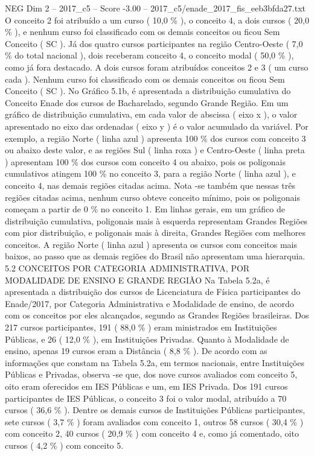 \begin{textsample}{NEG Dim 2 – 2017\_c5 – Score -3.00 – 2017\_c5/enade\_2017\_fis\_eeb3bfda27.txt}
O conceito 2 foi atribuído a um curso ( 10,0 \% ), o conceito 4, a dois cursos ( 20,0 \% ), e nenhum curso foi classificado com os demais conceitos ou ficou Sem Conceito ( SC ).
Já dos quatro cursos participantes na região Centro-Oeste ( 7,0 \% do total nacional ), dois receberam conceito 4, o conceito modal ( 50,0 \% ), como já fora destacado.
A dois cursos foram atribuídos conceitos 2 e 3 ( um curso cada ).
Nenhum curso foi classificado com os demais conceitos ou ficou Sem Conceito ( SC ).
No Gráfico 5.1b, é apresentada a distribuição cumulativa do Conceito Enade dos cursos de Bacharelado, segundo Grande Região.
Em um gráfico de distribuição cumulativa, em cada valor de abscissa ( eixo x ), o valor apresentado no eixo das ordenadas ( eixo y ) é o valor acumulado da variável.
Por exemplo, a região Norte ( linha azul ) apresenta 100 \% dos cursos com conceito 3 ou abaixo deste valor, e as regiões Sul ( linha roxa ) e Centro-Oeste ( linha preta ) apresentam 100 \% dos cursos com conceito 4 ou abaixo, pois os poligonais cumulativos atingem 100 \% no conceito 3, para a região Norte ( linha azul ), e conceito 4, nas demais regiões citadas acima.
Nota -se também que nessas três regiões citadas acima, nenhum curso obteve conceito mínimo, pois os poligonais começam a partir de 0 \% no conceito 1.
Em linhas gerais, em um gráfico de distribuição cumulativa, poligonais mais à esquerda representam Grandes Regiões com pior distribuição, e poligonais mais à direita, Grandes Regiões com melhores conceitos.
A região Norte ( linha azul ) apresenta os cursos com conceitos mais baixos, ao passo que as demais regiões do Brasil não apresentam uma hierarquia. 5.2 CONCEITOS POR CATEGORIA ADMINISTRATIVA, POR MODALIDADE DE ENSINO E GRANDE REGIÃO Na Tabela 5.2a, é apresentada a distribuição dos cursos de Licenciatura de Física participantes do Enade/2017, por Categoria Administrativa e Modalidade de ensino, de acordo com os conceitos por eles alcançados, segundo as Grandes Regiões brasileiras.
Dos 217 cursos participantes, 191 ( 88,0 \% ) eram ministrados em Instituições Públicas, e 26 ( 12,0 \% ), em Instituições Privadas.
Quanto à Modalidade de ensino, apenas 19 cursos eram a Distância ( 8,8 \% ).
De acordo com as informações que constam na Tabela 5.2a, em termos nacionais, entre Instituições Públicas e Privadas, observa -se que, dos nove cursos avaliados com conceito 5, oito eram oferecidos em IES Públicas e um, em IES Privada.
Dos 191 cursos participantes de IES Públicas, o conceito 3 foi o valor modal, atribuído a 70 cursos ( 36,6 \% ).
Dentre os demais cursos de Instituições Públicas participantes, sete cursos ( 3,7 \% ) foram avaliados com conceito 1, outros 58 cursos ( 30,4 \% ) com conceito 2, 40 cursos ( 20,9 \% ) com conceito 4 e, como já comentado, oito cursos ( 4,2 \% ) com conceito 5.

\end{textsample}
